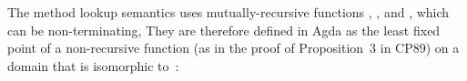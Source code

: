 \begin{AgdaAlign}
The method lookup semantics uses mutually-recursive functions 
, , and ,
which can be non-terminating, 
They are therefore defined in Agda as the least fixed point
of a non-recursive function 
(as in the proof of Proposition~3 in CP89) on a domain 
that is isomorphic to~:
%
\begin{code}%
%
\>[2]\AgdaSpace{}%
\AgdaSymbol{=}%
\>[8]\AgdaSymbol{(}\AgdaSpace{}%
\AgdaSpace{}%
\AgdaSpace{}%
\AgdaSpace{}%
\AgdaSpace{}%
\AgdaSpace{}%
\AgdaSymbol{)}\AgdaSpace{}%
\<%
\\
%
\>[8]\AgdaSymbol{(}\AgdaSpace{}%
\AgdaSpace{}%
\AgdaSpace{}%
\AgdaSpace{}%
\AgdaSpace{}%
\AgdaSpace{}%
\AgdaSpace{}%
\AgdaSpace{}%
\AgdaSymbol{)}\AgdaSpace{}%
\<%
\\
%
\>[8]\AgdaSymbol{(}\AgdaSpace{}%
\AgdaSpace{}%
\AgdaSpace{}%
\AgdaSpace{}%
\AgdaSpace{}%
\AgdaSpace{}%
\AgdaSpace{}%
\AgdaSpace{}%
\AgdaSpace{}%
\AgdaSpace{}%
\AgdaSymbol{)}\<%
\\
%
\\[\AgdaEmptyExtraSkip]%
%
\>[2]\AgdaSpace{}%
\AgdaModule{\AgdaUnderscore{}}\<%
\\
\>[2][@{}l@{\AgdaIndent{0}}]%
\>[6]\AgdaSymbol{\{}\AgdaSpace{}%
\AgdaSpace{}%
\AgdaSymbol{:}\AgdaSpace{}%
\AgdaSpace{}%
\AgdaSymbol{\}}\<%
\\
%
\>[6]\AgdaSymbol{\{\{}\AgdaSpace{}%
\AgdaSpace{}%
\AgdaSymbol{:}\AgdaSpace{}%
\AgdaSpace{}%
\AgdaSpace{}%
\AgdaSpace{}%
\AgdaSpace{}%
\AgdaSpace{}%
\AgdaSymbol{\}\}}\<%
\\
\>[2][@{}l@{\AgdaIndent{0}}]%
\>[4]\<%
\\
%
\>[4]\AgdaSpace{}%

\end{code}
\end{AgdaAlign}
